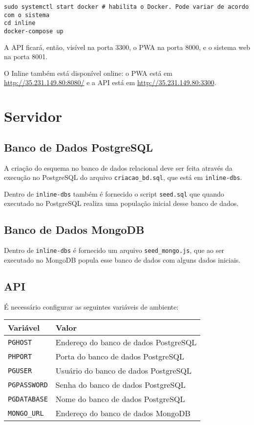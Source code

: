 \documentclass{book}
\begin{document}
\begin{verbatim}
sudo systemctl start docker # habilita o Docker. Pode variar de acordo com o sistema
cd inline
docker-compose up
\end{verbatim}

A API ficará, então, visível na porta 3300, o PWA na porta 8000, e o sistema web
na porta 8001.

O Inline também está disponível online: o PWA está em
\url{http://35.231.149.80:8080/} e a API está em \url{http://35.231.149.80:3300}.

\section{Servidor}
\subsection{Banco de Dados PostgreSQL}

A criação do esquema no banco de dados relacional deve ser feita através da
execução no PostgreSQL do arquivo \verb|criacao_bd.sql|, que está em
\verb|inline-dbs|.

Dentro de \verb|inline-dbs| também é fornecido o script \verb|seed.sql| que
quando executado no PostgreSQL realiza uma população inicial desse banco de
dados.

\subsection{Banco de Dados MongoDB}

Dentro de \verb|inline-dbs| é fornecido um arquivo \verb|seed_mongo.js|, que ao
ser executado no MongoDB popula esse banco de dados com alguns dados iniciais.

\subsection{API}
É necessário configurar as seguintes variáveis de ambiente:

\begin{center}
\begin{tabular}{|l|l|}
\hline
Variável & Valor \\
\hline
\verb|PGHOST| & Endereço do banco de dados PostgreSQL \\
\hline
\verb|PHPORT| & Porta do banco de dados PostgreSQL \\
\hline
\verb|PGUSER| & Usuário do banco de dados PostgreSQL \\
\hline
\verb|PGPASSWORD| & Senha do banco de dados PostgreSQL \\
\hline
\verb|PGDATABASE| & Nome do banco de dados PostgreSQL \\
\hline
\verb|MONGO_URL| & Endereço do banco de dados MongoDB \\
\hline
\end{tabular}
\end{center}
\end{document}
